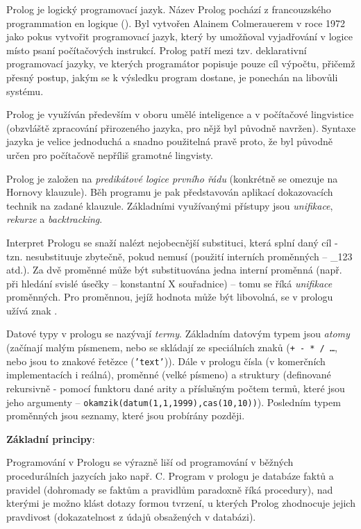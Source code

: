Prolog je logický programovací jazyk. Název Prolog pochází z francouzského programmation en logique (). Byl vytvořen Alainem Colmerauerem v roce 1972 jako pokus vytvořit programovací jazyk, který by umožňoval vyjadřování v logice místo psaní počítačových instrukcí. Prolog patří mezi tzv. deklarativní programovací jazyky, ve kterých programátor popisuje pouze cíl výpočtu, přičemž přesný postup, jakým se k výsledku program dostane, je ponechán na libovůli systému.

Prolog je využíván především v oboru umělé inteligence a v počítačové lingvistice (obzvláště zpracování přirozeného jazyka, pro nějž byl původně navržen). Syntaxe jazyka je velice jednoduchá a snadno použitelná pravě proto, že byl původně určen pro počítačově nepříliš gramotné lingvisty.

Prolog je založen na \emph{predikátové logice prvního řádu} (konkrétně se omezuje na Hornovy klauzule). Běh programu je pak představován aplikací dokazovacích technik na zadané klauzule. Základními využívanými přístupy jsou \emph{unifikace}, \emph{rekurze} a \emph{backtracking}.

Interpret Prologu se snaží nalézt nejobecnější substituci, která splní daný cíl - tzn. nesubstituuje zbytečně, pokud nemusí (použití interních proměnných -- \_123 atd.). Za dvě proměnné může být substituována jedna interní proměnná (např. při hledání svislé úsečky -- konstantní X souřadnice) -- tomu se říká \emph{unifikace} proměnných. Pro proměnnou, jejíž hodnota může být libovolná, se v prologu užívá znak \uv{\_}. 

Datové typy v prologu se nazývají \emph{termy}. Základním datovým typem jsou \emph{atomy} (začínají malým písmenem, nebo se skládají ze speciálních znaků (\texttt{+ - * / \dots}, nebo jsou to znakové řetězce (\texttt{'text'})). Dále  v prologu čísla (v komerčních implementacích i reálná), proměnné (velké písmeno) a struktury (definované rekursivně - pomocí funktoru dané arity a příslušným počtem termů, které jsou jeho argumenty -- \texttt{okamzik(datum(1,1,1999),cas(10,10))}). Posledním typem proměnných jsou seznamy, které jsou probírány později.

\medskip\textbf{Základní principy}:

Programování v Prologu se výrazně liší od programování v běžných procedurálních jazycích jako např. C. Program v prologu je databáze faktů a pravidel (dohromady se faktům a pravidlům paradoxně říká procedury), nad kterými je možno klást dotazy formou tvrzení, u kterých Prolog zhodnocuje jejich pravdivost (dokazatelnost z údajů obsažených v databázi).

